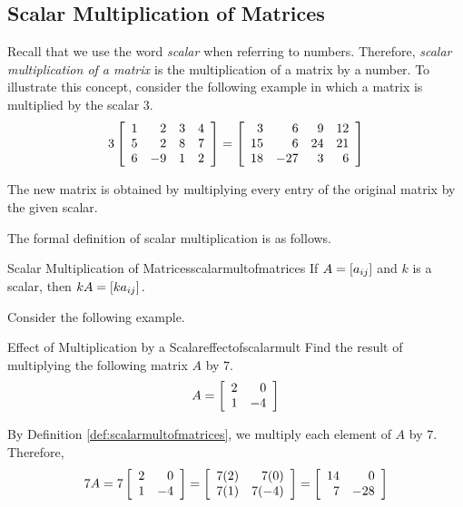 \subsection{Scalar Multiplication of Matrices}

Recall that we use the word {\em scalar \em}when referring to numbers. Therefore, {\em scalar multiplication of a matrix \em}is the multiplication of a matrix by a number.  
To illustrate this concept, consider the following example in which a
matrix is multiplied by the scalar $3$.
\begin{equation*}
3\left[
\begin{array}{rrrr}
1 & 2 & 3 & 4 \\
5 & 2 & 8 & 7 \\
6 & -9 & 1 & 2
\end{array}
\right] = \left[
\begin{array}{rrrr}
3 & 6 & 9 & 12 \\
15 & 6 & 24 & 21 \\
18 & -27 & 3 & 6
\end{array}
\right] 
\end{equation*}

The new matrix is obtained by multiplying every entry of the original matrix
by the given scalar. 

The formal definition of scalar multiplication is as follows.

\begin{definition}{Scalar Multiplication of Matrices}{scalarmultofmatrices}
If $A=\left[ a_{ij}\right] $ and $k$ is a scalar,
then $kA=\left[ ka_{ij}\right] .$ 
\end{definition}

Consider the following example.

\begin{example}{Effect of Multiplication by a Scalar}{effectofscalarmult}
Find the result of multiplying the following matrix $A$ by $7$.
\begin{equation*}
A=\left[
\begin{array}{rr}
2 & 0 \\
1 & -4
\end{array}
\right]
\end{equation*}
\end{example}

\begin{solution}
By Definition \ref{def:scalarmultofmatrices}, we multiply each element of $A$ by $7$.
Therefore,
\begin{equation*}
7A = 
7\left[
\begin{array}{rr}
2 & 0 \\
1 & -4
\end{array}
\right] =
\left[
\begin{array}{rr}
7(2) & 7(0) \\
7(1) & 7(-4)
\end{array}
\right] =
\left[
\begin{array}{rr}
14 & 0 \\
7 & -28
\end{array}
\right]
\end{equation*}
\end{solution}


